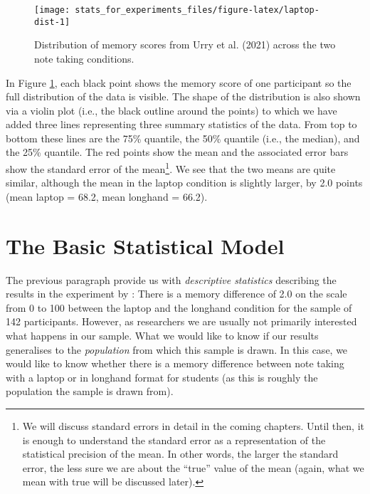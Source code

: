 \documentclass[
]{book}
\begin{document}
\begin{figure}

{\centering \texttt{[image: stats\_for\_experiments\_files/figure-latex/laptop-dist-1]} 

}

\caption{Distribution of memory scores from Urry et al. (2021) across the two note taking conditions.}\label{fig:laptop-dist}
\end{figure}

In Figure \ref{fig:laptop-dist}, each black point shows the memory score of one participant so the full distribution of the data is visible. The shape of the distribution is also shown via a violin plot (i.e., the black outline around the points) to which we have added three lines representing three summary statistics of the data. From top to bottom these lines are the 75\% quantile, the 50\% quantile (i.e., the median), and the 25\% quantile. The red points show the mean and the associated error bars show the standard error of the mean\footnote{We will discuss standard errors in detail in the coming chapters. Until then, it is enough to understand the standard error as a representation of the statistical precision of the mean. In other words, the larger the standard error, the less sure we are about the ``true'' value of the mean (again, what we mean with true will be discussed later).}. We see that the two means are quite similar, although the mean in the laptop condition is slightly larger, by 2.0 points (mean laptop = 68.2, mean longhand = 66.2).

\hypertarget{the-basic-statistical-model}{%
\section{The Basic Statistical Model}\label{the-basic-statistical-model}}

The previous paragraph provide us with \emph{descriptive statistics} describing the results in the experiment by \citet{urry2021}: There is a memory difference of 2.0 on the scale from 0 to 100 between the laptop and the longhand condition for the sample of 142 participants. However, as researchers we are usually not primarily interested what happens in our sample. What we would like to know if our results generalises to the \emph{population} from which this sample is drawn. In this case, we would like to know whether there is a memory difference between note taking with a laptop or in longhand format for students (as this is roughly the population the sample is drawn from).
\end{document}
